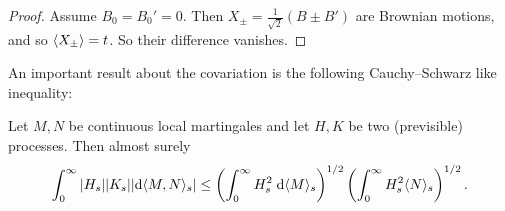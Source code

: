 \documentclass[a4paper]{article}
\begin{document}
\begin{proof}
  Assume $B_0 = B_0' = 0$. Then $X_{\pm} = \frac{1}{\sqrt{2}}(B \pm B')$ are Brownian motions, and so $\langle X_{\pm}\rangle = t$. So their difference vanishes.
\end{proof}

An important result about the covariation is the following Cauchy--Schwarz like inequality:
\begin{prop}
  Let $M, N$ be continuous local martingales and let $H, K$ be two (previsible) processes. Then almost surely
  \[
    \int_0^\infty |H_s| |K_s| |\mathrm{d} \langle M, N\rangle_s| \leq \left(\int_0^\infty H_s^2 \;\mathrm{d} \langle M\rangle_s\right)^{1/2} \left(\int_0^\infty H_s^2 \langle N\rangle_s\right)^{1/2}.
  \]
\end{prop}
\end{document}
